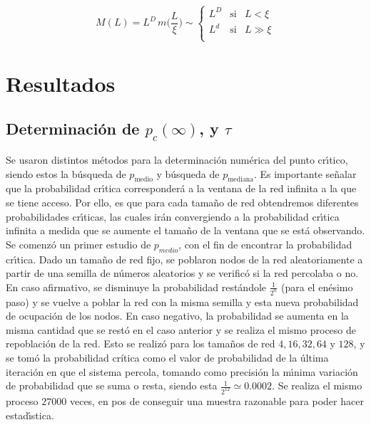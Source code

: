 \documentclass[
 reprint,
 amsmath,amssymb,
 aps,
]{revtex4-1}
\begin{document}
\begin{equation}
M(L)=L^D\,m\bigg(\displaystyle\frac{L}{\xi}\bigg)\sim\left\{\begin{array}{lll}
             L^D       & \textrm{si} & L<\xi \\
             L^d       & \textrm{si} & L\gg\xi \\
            \end{array}\right.\label{eqn_2}
\end{equation}


\section{\label{results}Resultados}

\subsection{\label{p_c} Determinaci\'on de $p_c(\infty)$, y $\tau$}

Se usaron distintos m\'etodos para la determinaci\'on num\'erica del punto cr\'\i tico, siendo estos la b\'usqueda de $p_\mathrm{medio}$ y b\'usqueda de $p_\mathrm{mediana}$. Es importante se\~nalar que la probabilidad cr\'\i tica corresponder\'a a la ventana de la red infinita a la que se tiene acceso. Por ello, es que para cada tama\~no de red obtendremos diferentes probabilidades cr\'\i ticas, las cuales ir\'an convergiendo a la probabilidad cr\'\i tica infinita a medida que se aumente el tama\~no de la ventana que se est\'a observando.
Se comenz\'o un primer estudio de $p_{medio}$, con el fin de encontrar la probabilidad cr\'\i tica. Dado un tama\~no de red fijo, se poblaron nodos de la red aleatoriamente a partir de una semilla de n\'umeros aleatorios y se verific\'o si la red percolaba o no. En caso afirmativo, se disminuye la probabilidad rest\'andole $\frac{1}{2^n}$ (para el en\'esimo paso) y se vuelve a poblar la red con la misma semilla y esta nueva probabilidad de ocupaci\'on de los nodos. En caso negativo, la probabilidad se aumenta en la misma cantidad que se rest\'o en el caso anterior y se realiza el mismo proceso de repoblaci\'on de la red. Esto se realiz\'o para los tama\~nos de red $4, 16, 32, 64$ y $128$, y se tom\'o la probabilidad cr\'itica como el valor de probabilidad de la \'ultima iteraci\'on en que el sistema percola, tomando como precisi\'on la m\'\i nima variaci\'on de probabilidad que se suma o resta, siendo esta $\frac{1}{2^{12}} \simeq 0.0002$. Se realiza el mismo proceso $27000$ veces, en pos de conseguir una muestra razonable para poder hacer estad\'\i stica.
\end{document}
